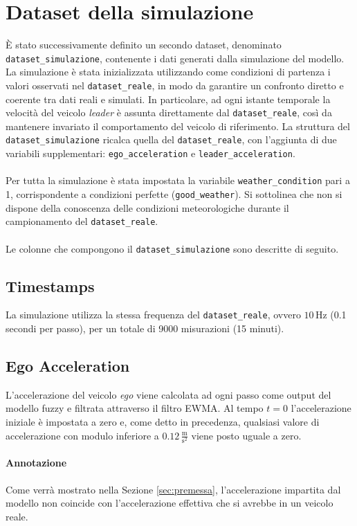 \section{Dataset della simulazione}
\noindent È stato successivamente definito un secondo dataset, denominato \texttt{dataset\_simulazione}, 
contenente i dati generati dalla simulazione del modello.  
La simulazione è stata inizializzata utilizzando come condizioni di partenza i valori osservati nel \texttt{dataset\_reale}, 
in modo da garantire un confronto diretto e coerente tra dati reali e simulati.  
In particolare, ad ogni istante temporale la velocità del veicolo \emph{leader} è assunta direttamente dal \texttt{dataset\_reale}, 
così da mantenere invariato il comportamento del veicolo di riferimento.  
La struttura del \texttt{dataset\_simulazione} ricalca quella del \texttt{dataset\_reale}, 
con l'aggiunta di due variabili supplementari: \texttt{ego\_acceleration} e \texttt{leader\_acceleration}. 
\\\\
\noindent Per tutta la simulazione è stata impostata la variabile \texttt{weather\_condition} pari a 1, 
corrispondente a condizioni perfette (\texttt{good\_weather}).   
Si sottolinea che non si dispone della conoscenza delle condizioni meteorologiche durante il 
campionamento del \texttt{dataset\_reale}.
\\\\
Le colonne che compongono il \texttt{dataset\_simulazione} sono descritte di seguito.

\subsection{Timestamps}
La simulazione utilizza la stessa frequenza del \texttt{dataset\_reale}, 
ovvero $10\,\mathrm{Hz}$ (0.1 secondi per passo), per un totale di 9000 misurazioni (15 minuti).

\subsection{Ego Acceleration}
\label{subsec:ego_acceleration}
L'accelerazione del veicolo \emph{ego} viene calcolata ad ogni passo come output del modello fuzzy e filtrata attraverso il filtro EWMA.  
Al tempo $t=0$ l'accelerazione iniziale è impostata a zero e, come detto in precedenza, qualsiasi valore di accelerazione con modulo
inferiore a $0.12 \,\frac{\mathrm{m}}{\mathrm{s^2}}$ viene posto uguale a zero.

\paragraph{Annotazione} Come verrà mostrato nella Sezione \ref{sec:premessa}, 
l'accelerazione impartita dal modello non coincide con l'accelerazione effettiva che si avrebbe in un veicolo reale.  


